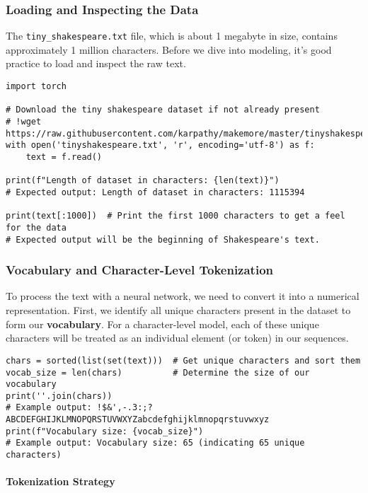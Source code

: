 \subsubsection{Loading and Inspecting the Data}

The \texttt{tiny\_shakespeare.txt} file, which is about 1 megabyte in size, contains approximately 1 million characters. Before we dive into modeling, it's good practice to load and inspect the raw text.

\begin{lstlisting}[caption={Loading and inspecting Tiny Shakespeare data}]
import torch

# Download the tiny shakespeare dataset if not already present
# !wget https://raw.githubusercontent.com/karpathy/makemore/master/tinyshakespeare.txt
with open('tinyshakespeare.txt', 'r', encoding='utf-8') as f:
    text = f.read()

print(f"Length of dataset in characters: {len(text)}")
# Expected output: Length of dataset in characters: 1115394

print(text[:1000])  # Print the first 1000 characters to get a feel for the data
# Expected output will be the beginning of Shakespeare's text.
\end{lstlisting}

\subsubsection{Vocabulary and Character-Level Tokenization}

To process the text with a neural network, we need to convert it into a numerical representation. First, we identify all unique characters present in the dataset to form our \textbf{vocabulary}. For a character-level model, each of these unique characters will be treated as an individual element (or token) in our sequences.

\begin{lstlisting}[caption={Creating vocabulary and sorting characters}]
chars = sorted(list(set(text)))  # Get unique characters and sort them
vocab_size = len(chars)          # Determine the size of our vocabulary
print(''.join(chars))
# Example output: !$&',-.3:;?ABCDEFGHIJKLMNOPQRSTUVWXYZabcdefghijklmnopqrstuvwxyz
print(f"Vocabulary size: {vocab_size}")
# Example output: Vocabulary size: 65 (indicating 65 unique characters)
\end{lstlisting}

\paragraph{Tokenization Strategy}

